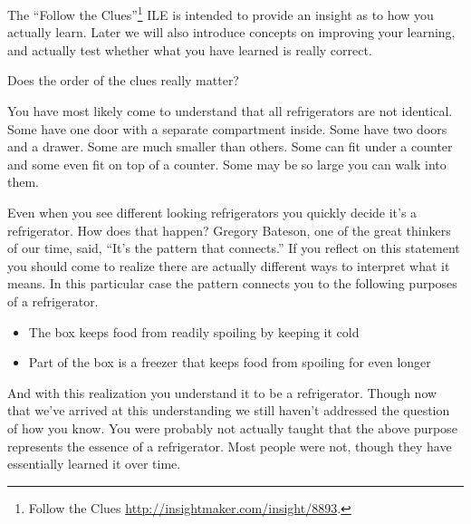 \documentclass[]{memoir}
\begin{document}
The ``Follow the Clues''\footnote{Follow the Clues
  \url{http://insightmaker.com/insight/8893}.} ILE is intended to
provide an insight as to how you actually learn. Later we will also
introduce concepts on improving your learning, and actually test whether
what you have learned is really correct.

\FloatBarrier 

\begin{model}[frametitle={Model: Follow the clues}] 

 Does the order of the clues really matter?




 \end{model}

You have most likely come to understand that all refrigerators are not
identical. Some have one door with a separate compartment inside. Some
have two doors and a drawer. Some are much smaller than others. Some can
fit under a counter and some even fit on top of a counter. Some may be
so large you can walk into them.

Even when you see different looking refrigerators you quickly decide
it's a refrigerator. How does that happen? Gregory Bateson, one of the
great thinkers of our time, said, ``It's the pattern that connects.'' If
you reflect on this statement you should come to realize there are
actually different ways to interpret what it means. In this particular
case the pattern connects you to the following purposes of a
refrigerator.

\begin{itemize}
\itemsep1pt\parskip0pt
\item
  The box keeps food from readily spoiling by keeping it cold
\item
  Part of the box is a freezer that keeps food from spoiling for even
  longer
\end{itemize}

And with this realization you understand it to be a refrigerator. Though
now that we've arrived at this understanding we still haven't addressed
the question of how you know. You were probably not actually taught that
the above purpose represents the essence of a refrigerator. Most people
were not, though they have essentially learned it over time.
\end{document}
